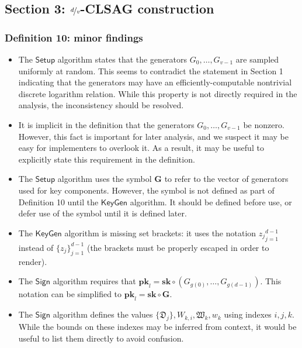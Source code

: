 \documentclass{article}
\begin{document}
\subsection{Section 3: \texorpdfstring{$\nicefrac{d}{v}$}{d/v}-CLSAG construction}


\subsubsection{Definition 10: minor findings}

\begin{itemize}
	\item The $\mathsf{Setup}$ algorithm states that the generators $G_0, \ldots, G_{v-1}$ are sampled uniformly at random.
	This seems to contradict the statement in Section 1 indicating that the generators may have an efficiently-computable nontrivial discrete logarithm relation.
	While this property is not directly required in the analysis, the inconsistency should be resolved.

	\item It is implicit in the definition that the generators $G_0, \ldots, G_{v-1}$ be nonzero.
	However, this fact is important for later analysis, and we suspect it may be easy for implementers to overlook it.
	As a result, it may be useful to explicitly state this requirement in the definition.

	\item The $\mathsf{Setup}$ algorithm uses the symbol $\bm{G}$ to refer to the vector of generators used for key components.
	However, the symbol is not defined as part of Definition 10 until the $\mathsf{KeyGen}$ algorithm.
	It should be defined before use, or defer use of the symbol until it is defined later.

	\item The $\mathsf{KeyGen}$ algorithm is missing set brackets: it uses the notation ${z_j}_{j=1}^{d-1}$ instead of $\{ z_j \}_{j=1}^{d-1}$ (the brackets must be properly escaped in order to render).

	\item The $\mathsf{Sign}$ algorithm requires that $\bm{pk}_l = \bm{sk} \circ (G_{g(0)}, \ldots, G_{g(d-1)})$.
	This notation can be simplified to $\bm{pk}_l = \bm{sk} \circ \bm{G}$.

	\item The $\mathsf{Sign}$ algorithm defines the values $\{ \mathfrak{D}_j \}, W_{k,i}, \mathfrak{W}_k, w_k$ using indexes $i, j, k$.
	While the bounds on these indexes may be inferred from context, it would be useful to list them directly to avoid confusion.


\end{itemize}
\end{document}
